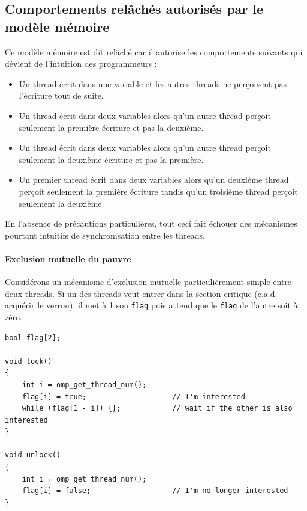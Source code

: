 \subsection{Comportements relâchés autorisés par le modèle mémoire \OMP}
\label{sec:relaxed-behaviors}

Ce modèle mémoire est dit \og relâché\fg{} car il autorise les
comportements suivants qui dévient de l'intuition des programmeurs :
\begin{itemize}
\item Un thread écrit dans une variable et les autres threads ne
  perçoivent pas l'écriture tout de suite.
  
\item Un thread écrit dans deux variables alors qu'un autre
  thread perçoit seulement la première écriture et pas la deuxième.

\item Un thread écrit dans deux variables alors qu'un autre
  thread perçoit seulement la deuxième écriture et pas la première.

\item Un premier thread écrit dans deux variables alors qu'un
  deuxième thread perçoit seulement la première écriture tandis qu'un
  troisième thread perçoit seulement la deuxième.
\end{itemize}

\medskip

En l'absence de précautions particulières, tout ceci fait échouer des
mécanismes pourtant intuitifs de synchronisation entre les threads.

\paragraph{Exclusion mutuelle du pauvre} Considérons un mécanisme
d'exclusion mutuelle particulièrement simple entre deux threads. Si un
des threads veut entrer dans la section critique (c.a.d. acquérir le
verrou), il met à 1 son \texttt{flag} puis attend que le \texttt{flag}
de l'autre soit à zéro.

\begin{myfilet}
\begin{verbatim}
bool flag[2];

void lock() 
{
	int i = omp_get_thread_num();
	flag[i] = true;                    // I'm interested
	while (flag[1 - i]) {};            // wait if the other is also interested
}

void unlock() 
{
	int i = omp_get_thread_num();
	flag[i] = false;                   // I'm no longer interested
}
\end{verbatim}
\end{myfilet}

